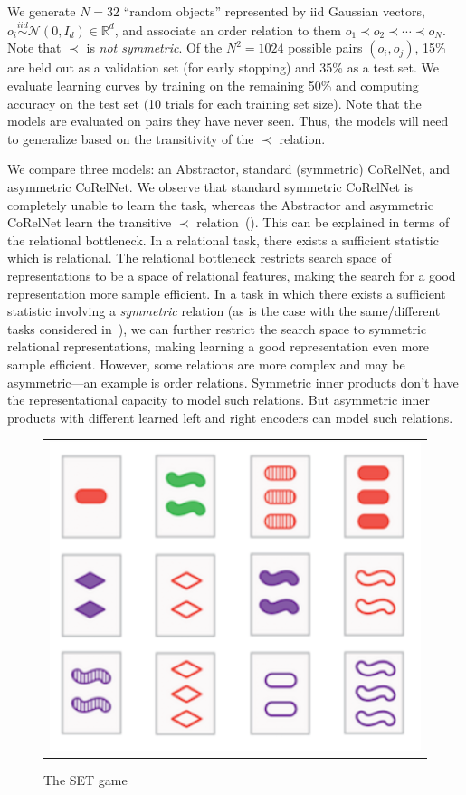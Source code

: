 We generate $N = 32$ ``random objects'' represented by iid Gaussian vectors, $o_i \overset{iid}{\sim} \mathcal{N}(0,
I_d) \in \mathbb{R}^d$, and associate an order relation to them $o_1 \prec o_2 \prec \cdots \prec o_N$. Note that $\prec$ is \textit{not symmetric}. Of the $N^2 = 1024$ possible pairs $(o_i, o_j)$, 15\% are held out as a validation set (for early stopping) and 35\% as a test set. We evaluate learning curves by training on the remaining 50\% and computing accuracy on the test set (10 trials for each training set size). Note that the models are evaluated on pairs they have never seen. Thus, the models will need to generalize based on the transitivity of the $\prec$ relation.

We compare three models: an Abstractor, standard (symmetric) CoRelNet, and asymmetric CoRelNet. We observe that standard symmetric CoRelNet is completely unable to learn the task, whereas the Abstractor and asymmetric CoRelNet learn the transitive $\prec$ relation~(). This can be explained in terms of the relational bottleneck. In a relational task, there exists a sufficient statistic which is relational. The relational bottleneck restricts search space of representations to be a space of relational features, making the search for a good representation more sample efficient. In a task in which there exists a sufficient statistic involving a \textit{symmetric} relation (as is the case with the same/different tasks considered in~\citep{kerg2022neural}), we can further restrict the search space to symmetric relational representations, making learning a good representation even more sample efficient.
However, some relations are more complex and may be asymmetric---an example is order relations. Symmetric inner products don't have the representational capacity to model such relations. But asymmetric inner products with different learned left and right encoders can model such relations.



\begin{figure}
	\vskip-5pt
	\begin{tabular}{c}
		\includegraphics[width=.25\textwidth]{figures/set_example}\\[-5pt]
	\end{tabular}
	\caption{\footnotesize The SET game}\label{fig:set_example}
\end{figure}
